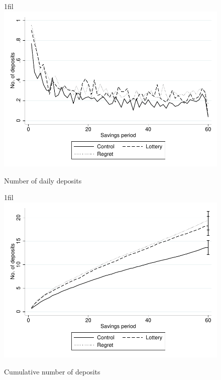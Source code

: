 \documentclass[10pt]{article}
\makeatletter
\newcommand*{\centerfloat}{%
  \parindent \z@
  \leftskip \z@ \@plus 1fil \@minus \textwidth
  \rightskip\leftskip
  \parfillskip \z@skip}
\makeatother
\begin{document}
		\begin{figure}[!htb]
		\centering
		\caption{Number of daily deposits}
		\centerfloat
		\includegraphics{../../figures/line-deposits.pdf}
		\end{figure}

		\begin{figure}[!htb]
		\centering
		\caption{Cumulative number of deposits}
		\centerfloat
		\includegraphics{../../figures/line-cumdeposits.pdf}
		\end{figure}
\end{document}
